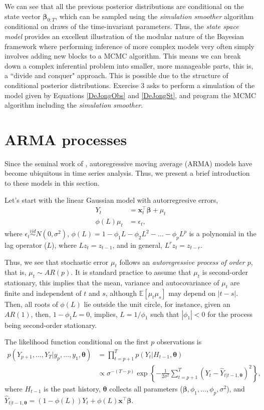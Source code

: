 We can see that all the previous posterior distributions are conditional on the state vector $\bm{\beta}_{0:T}$, which can be sampled using the \textit{simulation smoother} algorithm conditional on draws of the time-invariant parameters. Thus, the \textit{state space model} provides an excellent illustration of the modular nature of the Bayesian framework where performing inference of more complex models very often simply involves adding new blocks to a MCMC algorithm. This means we can break down a complex inferential problem into smaller, more manageable parts, this is, a ``divide and conquer" approach. This is possible due to the structure of conditional posterior distributions. Exercise 3 asks to perform a simulation of the model given by Equations \ref{DeJongObs} and \ref{DeJongSt}, and program the MCMC algorithm including the \textit{simulation smoother}.   

\section{ARMA processes}\label{sec82}

Since the seminal work of \cite{box_jenkins_1976}, autoregressive moving average (ARMA) models have become ubiquitous in time series analysis. Thus, we present a brief introduction to these models in this section.

Let's start with the linear Gaussian model with autorregresive errors,
\begin{align}
	Y_t & = \bm{x}_t^{\top}\bm{\beta}+\mu_t\label{eq1}\\
	\phi(L)\mu_t & = \epsilon_t \label{eq2}, 
\end{align}
where $\epsilon_t \stackrel{iid}{\sim} N(0,\sigma^2)$, $\phi(L)=1-\phi_1L-\phi_2L^2-\dots-\phi_pL^p$ is a polynomial in the lag operator ($L$), where $Lz_t=z_{t-1}$, and in general, $L^rz_t=z_{t-r}$.

Thus, we see that stochastic error $\mu_t$ follows an \textit{autoregressive process of order $p$}, that is, $\mu_t\sim AR(p)$. It is standard practice to assume that $\mu_t$ is second-order stationary, this implies that the mean, variance and autocovariance of $\mu_t$ are finite and independent of $t$ and $s$, although $\mathbb{E}[\mu_t\mu_s]$ may depend on $|t-s|$. Then, all roots of $\phi(L)$ lie outside the unit circle, for instance, given an $AR(1)$, then, $1-\phi_1L=0$, implies, $L=1/\phi_1$ such that  $|\phi_1|<0$ for the process being second-order stationary.

The likelihood function conditional on the first $p$ observations is
\begin{align*}
	p(Y_{p+1},\dots,Y_T|y_{p},\dots,y_1,\bm{\theta})&=\prod_{t=p+1}^{T}p(Y_t|H_{t-1},\bm{\theta})\\
	&\propto \sigma^{-(T-p)}\exp\left\{-\frac{1}{2\sigma^2}\sum_{t=p+1}^T(Y_t-\hat{Y}_{t|t-1,\bm{\theta}})^2\right\},
\end{align*} 
where $H_{t-1}$ is the past history, $\bm{\theta}$ collects all parameters ($\bm{\beta}, \phi_1,\dots,\phi_p, \sigma^2$), and $\hat{Y}_{t|t-1,\bm{\theta}}=(1-\phi(L))Y_t+\phi(L)\bm{x}^{\top}\bm{\beta}$.

